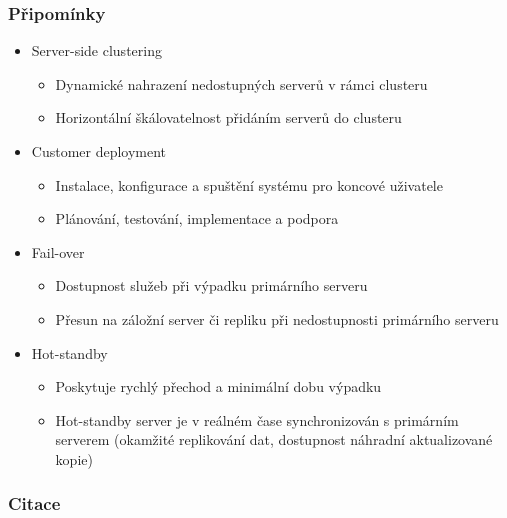 \documentclass{beamer}
\begin{document}
	\begin{frame}[noframenumbering]
		\frametitle{Připomínky}
		\begin{itemize}
			\item Server-side clustering
			\begin{itemize}
				\item Dynamické nahrazení nedostupných serverů v rámci clusteru
				\item Horizontální škálovatelnost přidáním serverů do clusteru
			\end{itemize}
			\item Customer deployment
			\begin{itemize}
				\item Instalace, konfigurace a spuštění systému pro koncové uživatele
				\item Plánování, testování, implementace a podpora
			\end{itemize}
			\item Fail-over
			\begin{itemize}
				\item Dostupnost služeb při výpadku primárního serveru
				\item Přesun na záložní server či repliku při nedostupnosti primárního serveru
			\end{itemize}
			\item Hot-standby
			\begin{itemize}
				\item Poskytuje rychlý přechod a minimální dobu výpadku
				\item Hot-standby server je v reálném čase synchronizován s primárním serverem (okamžité replikování dat, dostupnost náhradní aktualizované kopie)
			\end{itemize}
		\end{itemize}
	\end{frame}

	\begin{frame}
		\frametitle{Citace}
		
		\printbibliography
		
	\end{frame}
	
\end{document}
